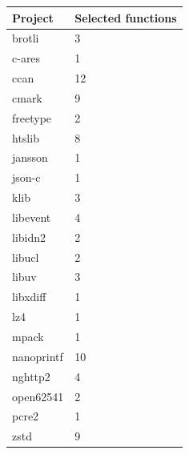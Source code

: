 \begin{tabular}{ll}
\toprule
Project & Selected functions \\
\midrule
brotli & 3 \\
c-ares & 1 \\
ccan & 12 \\
cmark & 9 \\
freetype & 2 \\
htslib & 8 \\
jansson & 1 \\
json-c & 1 \\
klib & 3 \\
libevent & 4 \\
libidn2 & 2 \\
libucl & 2 \\
libuv & 3 \\
libxdiff & 1 \\
lz4 & 1 \\
mpack & 1 \\
nanoprintf & 10 \\
nghttp2 & 4 \\
open62541 & 2 \\
pcre2 & 1 \\
zstd & 9 \\
\bottomrule
\end{tabular}
